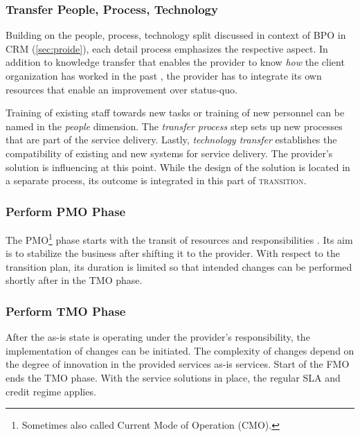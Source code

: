 	\subsubsection{Transfer People, Process, Technology}
	
	Building on the people, process, technology split discussed in context of  \acrshort{BPO} in \acrshort{CRM} (\cf \ref{sec:proide}), each detail process emphasizes the respective aspect. In addition to knowledge transfer that enables the provider to know \textit{how} the client organization has worked in the past \citep{perunovic2007outsourcing}, the provider has to integrate its own resources that enable an improvement over status-quo.
	
	 Training of existing staff towards new tasks or training of new personnel can be named in the \textit{people} dimension. The \textit{transfer process} step sets up new processes that are part of the service delivery. Lastly, \textit{technology transfer} establishes the compatibility of existing and new systems for service delivery. The provider's solution is influencing at this point. While the design of the solution is located in a separate process, its outcome is integrated in this part of \textsc{transition}. 
	
	\subsubsection{Perform \acrshort{PMO} Phase}
	The \acrshort{PMO}\footnote{Sometimes also called Current Mode of Operation (CMO). } phase starts with the transit of resources and responsibilities \citep{bitkom2008}. Its aim is to stabilize the business after shifting it to the provider. With respect to the transition plan, its duration is limited so that intended changes can be performed shortly after in the \acrshort{TMO} phase.
	
	\subsubsection{Perform \acrshort{TMO} Phase}
	After the as-is state is operating under the provider's responsibility, the implementation of changes can be initiated. The complexity of changes depend on the degree of innovation in the provided services \wrt as-is services. Start of the \acrshort{FMO} ends the \acrshort{TMO} phase. With the service solutions in place, the regular \acrshort{SLA} and credit regime applies.
	
	
	
